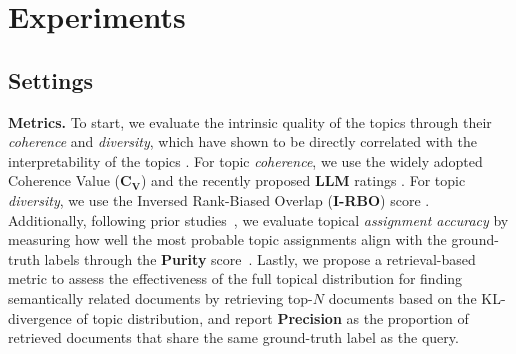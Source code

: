 \documentclass{article}
\theoremstyle{plain}
\theoremstyle{definition}
\theoremstyle{remark}
\begin{document}
\section{Experiments}
\label{sec:experiments}

\subsection{Settings}

\textbf{Metrics. }
To start, we evaluate the intrinsic quality of the topics through their \textit{coherence} and \textit{diversity}, which have shown to be directly correlated with the interpretability of the topics \citep{dieng-etal-2020-topic, li-etal-2023-diversity}. For topic \textit{coherence}, we use the widely adopted Coherence Value ($\mathbf{C_V}$) \citep{roder2015exploring} and the recently proposed \textbf{LLM} ratings \citep{stammbach-etal-2023-revisiting}.
For topic \textit{diversity}, we use the Inversed Rank-Biased Overlap (\textbf{I-RBO}) score \citep{terragni2021word, bianchi-etal-2021-pre}. Additionally, following prior studies~\citep{poursabzi-sangdeh-etal-2016-alto, hoyle-etal-2022-neural, pham-etal-2024-topicgpt}, we evaluate topical \textit{assignment accuracy} by measuring how well the most probable topic assignments align with the ground-truth labels through the \textbf{Purity} score~\citep{zhao2001criterion}. Lastly, we propose a retrieval-based metric to assess the effectiveness of the full topical distribution for finding semantically related documents by retrieving top-$N$ documents based on the KL-divergence of topic distribution, and report \textbf{Precision} as the proportion of retrieved documents that share the same ground-truth label as the query.

\end{document}

